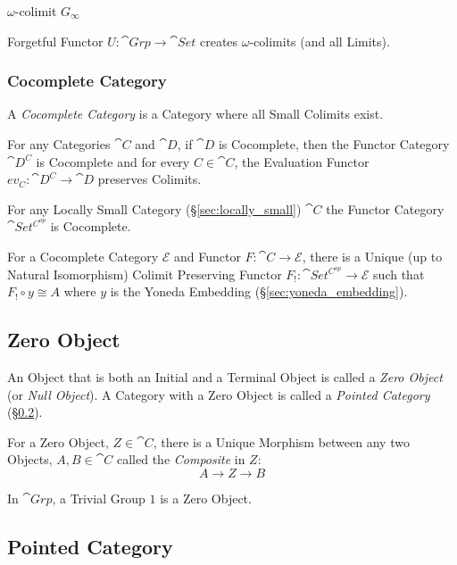 $\omega$-colimit $G_\infty$

Forgetful Functor $U : \cat{Grp} \rightarrow \cat{Set}$ creates
$\omega$-colimits (and all Limits). \cite{awodey06}



\subsubsection{Cocomplete Category}\label{sec:cocomplete_category}

A \emph{Cocomplete Category} is a Category where all Small Colimits
exist.

For any Categories $\cat{C}$ and $\cat{D}$, if $\cat{D}$ is
Cocomplete, then the Functor Category $\cat{D^C}$ is Cocomplete and
for every $C \in \cat{C}$, the Evaluation Functor $ev_C :
\cat{D^C} \rightarrow \cat{D}$ preserves Colimits.

For any Locally Small Category (\S\ref{sec:locally_small})
$\cat{C}$ the Functor Category $\cat{Set^{C^{op}}}$ is
Cocomplete.

For a Cocomplete Category $\mathcal{E}$ and Functor $F : \cat{C}
\rightarrow \mathcal{E}$, there is a Unique (up to Natural
Isomorphism) Colimit Preserving Functor $F_! : \cat{Set^{C^{op}}}
\rightarrow \mathcal{E}$ such that $F_! \circ y \cong A$ where $y$ is
the Yoneda Embedding (\S\ref{sec:yoneda_embedding}).\cite{awodey06}



\subsection{Zero Object}\label{sec:zero_object}

An Object that is both an Initial and a Terminal Object is called a
\emph{Zero Object} (or \emph{Null Object}). A Category with a Zero
Object is called a \emph{Pointed Category}
(\S\ref{sec:pointed_category}).

For a Zero Object, $Z \in \cat{C}$, there is a Unique Morphism
between any two Objects, $A, B \in \cat{C}$ called the
\emph{Composite} in $Z$:
\[
  A \rightarrow Z \rightarrow B
\]

In $\cat{Grp}$, a Trivial Group ${1}$ is a Zero Object.



\subsection{Pointed Category}\label{sec:pointed_category}




